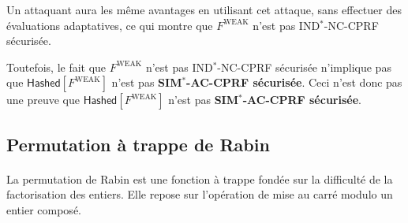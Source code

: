 \documentclass[9pt]{extarticle}
\begin{document}
\begin{itemize}
Un attaquant aura les même avantages en utilisant cet attaque, sans effectuer des évaluations adaptatives, ce qui montre que $F^{\text{WEAK}}$ n'est pas IND$^*$-NC-CPRF sécurisée.

\end{itemize}

Toutefois, le fait que $F^{\text{WEAK}}$ n'est pas IND$^*$-NC-CPRF sécurisée n'implique pas que $\textsf{Hashed}[F^{\text{WEAK}}]$ n'est pas \textbf{SIM$^*$-AC-CPRF sécurisée}. Ceci n'est donc pas une preuve que $\textsf{Hashed}[F^{\text{WEAK}}]$ n'est pas \textbf{SIM$^*$-AC-CPRF sécurisée}.

\subsection{Permutation à trappe de Rabin}

\paragraph{}La permutation de Rabin est une fonction à trappe fondée sur la difficulté de la factorisation des entiers. Elle repose sur l'opération de mise au carré modulo un entier composé.
\end{document}
